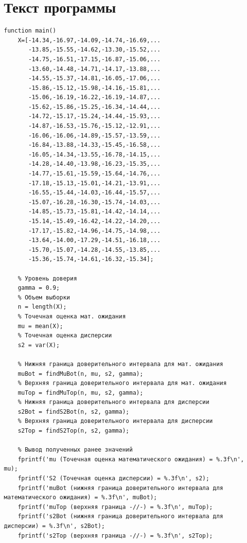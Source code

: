 \documentclass[a4paper,oneside,12pt]{extreport}
\theoremstyle{indented}
\begin{document}
\section{Текст программы}
\hfill 
\begin{lstlisting}[caption=Реализация]
function main()
    X=[-14.34,-16.97,-14.09,-14.74,-16.69,...
       -13.85,-15.55,-14.62,-13.30,-15.52,...
       -14.75,-16.51,-17.15,-16.87,-15.06,...
       -13.60,-14.48,-14.71,-14.17,-13.88,...
       -14.55,-15.37,-14.81,-16.05,-17.06,...
       -15.86,-15.12,-15.98,-14.16,-15.81,...
       -15.06,-16.19,-16.22,-16.19,-14.87,...
       -15.62,-15.86,-15.25,-16.34,-14.44,...
       -14.72,-15.17,-15.24,-14.44,-15.93,...
       -14.87,-16.53,-15.76,-15.12,-12.91,...
       -16.06,-16.06,-14.89,-15.57,-13.59,...
       -16.84,-13.88,-14.33,-15.45,-16.58,...
       -16.05,-14.34,-13.55,-16.78,-14.15,...
       -14.28,-14.40,-13.98,-16.23,-15.35,...
       -14.77,-15.61,-15.59,-15.64,-14.76,...
       -17.18,-15.13,-15.01,-14.21,-13.91,...
       -16.55,-15.44,-14.03,-16.44,-15.57,...
       -15.07,-16.28,-16.30,-15.74,-14.03,...
       -14.85,-15.73,-15.81,-14.42,-14.14,...
       -15.14,-15.49,-16.42,-14.22,-14.20,...
       -17.17,-15.82,-14.96,-14.75,-14.98,...
       -13.64,-14.00,-17.29,-14.51,-16.18,...
       -15.70,-15.07,-14.28,-14.55,-13.85,...
       -15.36,-15.74,-14.61,-16.32,-15.34];
   
    % Уровень доверия
    gamma = 0.9;
    % Объем выборки 
    n = length(X);
    % Точечная оценка мат. ожидания
    mu = mean(X);
    % Точечная оценка дисперсии
    s2 = var(X);
    
    % Нижняя граница доверительного интервала для мат. ожидания
    muBot = findMuBot(n, mu, s2, gamma);
    % Верхняя граница доверительного интервала для мат. ожидания
    muTop = findMuTop(n, mu, s2, gamma);
    % Нижняя граница доверительного интервала для дисперсии
    s2Bot = findS2Bot(n, s2, gamma);
    % Верхняя граница доверительного интервала для дисперсии
    s2Top = findS2Top(n, s2, gamma);
    
    % Вывод полученных ранее значений
    fprintf('mu (Точечная оценка математического ожидания) = %.3f\n', mu);
    fprintf('S2 (Точечная оценка дисперсии) = %.3f\n', s2);
    fprintf('muBot (нижняя граница доверительного интервала для математического ожидания) = %.3f\n', muBot);
    fprintf('muTop (верхняя граница -//-) = %.3f\n', muTop);
    fprintf('s2Bot (нижняя граница доверительного интервала для дисперсии) = %.3f\n', s2Bot);
    fprintf('s2Top (верхняя граница -//-) = %.3f\n', s2Top);
    

\end{lstlisting}
\end{document}
